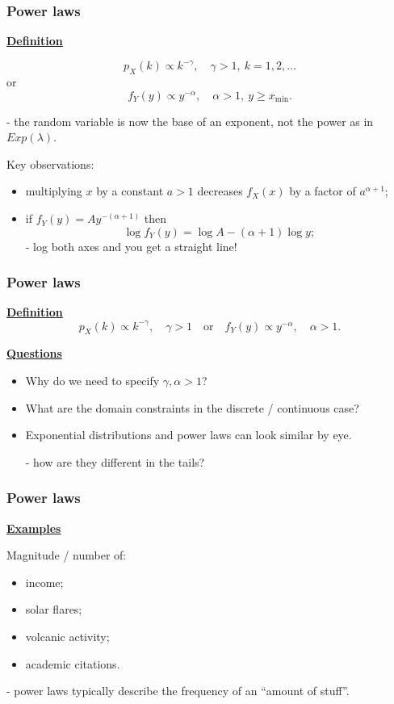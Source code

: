 \documentclass[t,8pt]{beamer}
\begin{document}
\begin{frame}
	\frametitle{Power laws}
	
	{\bf\underline{Definition}} \par
	\[
	p_X(k)\propto k^{-\gamma},\quad \gamma>1,\ k=1,2,\dots
	\]
	or
	\[
	f_Y(y)\propto y^{-\alpha},\quad \alpha>1,\ y\geq x_{\min}.
	\]
	
	{\small\color{NavyBlue}
		- the random variable is now the base of an exponent, not the power as in $Exp(\lambda)$.
	}\par
	
	Key observations:
	\begin{itemize}
		\item multiplying $x$ by a constant $a>1$ decreases $f_X(x)$ by a factor of $a^{\alpha+1}$;
		\item if $f_Y(y)=Ay^{-(\alpha+1)}$ then
		\[
		\log f_Y(y)=\log A-(\alpha+1)\log y;
		\]
		- log both axes and you get a straight line!
	\end{itemize}
\end{frame}

\begin{frame}
	\frametitle{Power laws}
	
	\color{gray}
	{\bf\underline{Definition}}
	\[
	p_X(k)\propto k^{-\gamma},\quad \gamma>1
	\quad\text{or}\quad
	f_Y(y)\propto y^{-\alpha},\quad \alpha>1.
	\]
	\color{black}
	
	{\bf\underline{Questions}}
	\begin{itemize}
		\item Why do we need to specify $\gamma,\alpha>1$?
		\item What are the domain constraints in the discrete / continuous case?
		\item Exponential distributions and power laws can look similar by eye. \par
		- how are they different in the tails?
	\end{itemize}
\end{frame}

\begin{frame}
	\frametitle{Power laws}
	
	{\bf\underline{Examples}} \par
	Magnitude / number of:
	\begin{itemize}
		\item income;
		\item solar flares;
		\item volcanic activity;
		\item academic citations.
	\end{itemize}
	
	{\small\color{NavyBlue}
		- power laws typically describe the frequency of an ``amount of stuff''.
	}
\end{frame}
\end{document}
